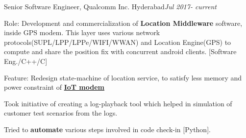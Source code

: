 \documentclass{resume}
\begin{document}
 
\begin{rSection}{}
\begin{rSubsection}{Senior Software Engineer, Qualcomm Inc. Hyderabad}{\emph{Jul 2017- current}}{}{} 
\item Role: Development and commercialization of \textbf{Location Middleware }software, inside GPS modem. This layer uses various network protocols(SUPL/LPP/LPPe/WIFI/WWAN) and Location Engine(GPS) to compute and share the position fix with concurrent android clients. [Software Eng./C++/C]
\\
\item Feature: Redesign state-machine of location service, to satisfy less memory and power constraint of {\href{https://www.qualcomm.com/products/qualcomm-9205-lte-modem}{\textbf{IoT modem}}}
\\
\item Took initiative of creating a log-playback tool which helped in simulation of customer test scenarios from the logs. 
\item Tried to \textbf{automate} various steps involved in code check-in [Python].
\end{rSubsection} 
\end{rSection} 
\end{document}
